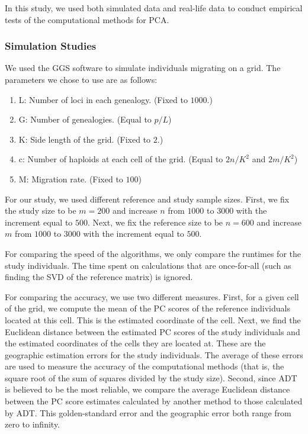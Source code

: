 \documentclass{article}
\begin{document}
In this study, we used both simulated data and real-life data to conduct
empirical tests of the computational methods for PCA.

\subsubsection{Simulation Studies}

We used the GGS software to simulate individuals migrating on a grid.
The parameters we chose to use are as follows:
\begin{enumerate}
\item L: Number of loci in each genealogy. (Fixed to $1000$.)
\item G: Number of genealogies. (Equal to $p / L$)
\item K: Side length of the grid. (Fixed to $2$.)
\item c: Number of haploids at each cell of the grid. (Equal to $2n / K^2$ and
$2m / K^2$)
\item M: Migration rate. (Fixed to $100$)
\end{enumerate}

For our study, we used different reference and study sample sizes.
First, we fix
the study size to be $m=200$ and increase $n$ from $1000$ to $3000$ with the
increment equal to $500$.
Next, we fix
the reference size to be $n=600$ and increase $m$ from $1000$ to $3000$ with the increment equal to $500$.

For comparing the speed of the algorithms,
we only compare the runtimes for the study individuals.
The time spent on calculations that are once-for-all (such as finding the SVD of
the reference matrix) is ignored.

For comparing the accuracy, we use two different measures.
First, for a given cell of the grid, we compute the mean of the PC scores of the 
reference individuals located at this cell.  
This is the estimated coordinate of the cell.
Next, we find the Euclidean distance between the estimated PC scores of the
study individuals and the estimated coordinates of the cells they are located
at.
These are the geographic estimation errors for the study individuals.
The average of these errors are used to measure the accuracy of the
computational methods (that is, the square root of the sum of squares divided by the
study size). 
Second, since ADT is believed to be the most reliable, we compare the average
Euclidean distance between the PC score estimates calculated by another method
to those calculated by ADT. 
This golden-standard error and the geographic error both range from zero to infinity.
\end{document}
